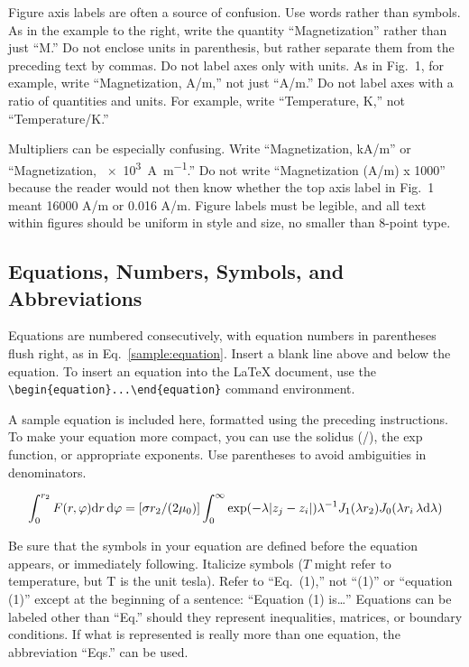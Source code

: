 \documentclass[conf]{new-aiaa}
\begin{document}
Figure axis labels are often a source of confusion. Use words rather than symbols. As in the example to the right, write the quantity ``Magnetization'' rather than just ``M.'' Do not enclose units in parenthesis, but rather separate them from the preceding text by commas. Do not label axes only with units. As in Fig.~1, for example, write ``Magnetization, \si[per-mode=symbol]{\ampere\per\meter},'' not just ``A/m.'' Do not label axes with a ratio of quantities and units. For example, write ``Temperature, K,'' not ``Temperature/K.''

Multipliers can be especially confusing. Write ``Magnetization, \si[per-mode=symbol]{\kilo\ampere\per\meter}'' or ``Magnetization, \SI[per-mode=symbol]{e3}{\ampere\per\meter}.'' Do not write ``Magnetization (A/m) x 1000'' because the reader would not then know whether the top axis label in Fig.~1 meant 16000 A/m or 0.016 A/m. Figure labels must be legible, and all text within figures should be uniform in style and size, no smaller than 8-point type.

\subsection{Equations, Numbers, Symbols, and Abbreviations}
Equations are numbered consecutively, with equation numbers in parentheses flush right, as in Eq.~\eqref{sample:equation}. Insert a blank line above and below the equation. To insert an equation into the \LaTeX{} document, use the \verb|\begin{equation}...\end{equation}| command environment.

A sample equation is included here, formatted using the preceding instructions. To make your equation more compact, you can use the solidus (/), the exp function, or appropriate exponents. Use parentheses to avoid ambiguities in denominators.

\begin{equation}
\label{sample:equation}
\int^{r_2}_0 F(r,\varphi){\rm d}r\,{\rm d}\varphi = [\sigma r_2/(2\mu_0)]\int^{\infty}_0\exp(-\lambda|z_j-z_i|)\lambda^{-1}J_1 (\lambda r_2)J_0 (\lambda r_i\,\lambda {\rm d}\lambda)
\end{equation}

Be sure that the symbols in your equation are defined before the equation appears, or immediately following. Italicize symbols ($T$ might refer to temperature, but T is the unit tesla). Refer to ``Eq.~(1),'' not ``(1)'' or ``equation (1)'' except at the beginning of a sentence: ``Equation (1) is\ldots'' Equations can be labeled other than ``Eq.'' should they represent inequalities, matrices, or boundary conditions. If what is represented is really more than one equation, the abbreviation ``Eqs.'' can be used.
\end{document}

